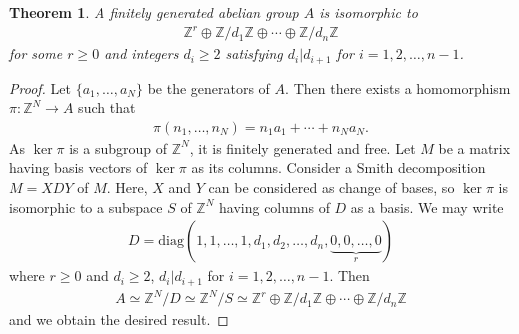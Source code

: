 \documentclass[12pt]{report}
\theoremstyle{plain}
\newtheorem{theorem}{Theorem}[section]
\theoremstyle{remark}
\theoremstyle{definition}
\newcommand{\Z}{\mathbb{Z}}
\begin{document}
\begin{theorem}\label{Theorem 1.18.8.}
    A finitely generated abelian group $A$ is isomorphic to
    \begin{align*}
        \Z^r \oplus \Z/d_1\Z \oplus \cdots\oplus \Z/d_n\Z
    \end{align*}
    for some $r\ge 0$ and integers $d_i\ge 2$ satisfying $d_i|d_{i+1}$ for $i=1,2,\dots,n-1$.
\end{theorem}
\begin{proof}
    Let $\{a_1,\dots,a_N\}$ be the generators of $A$. Then there exists a homomorphism
    $\pi:\Z^N\rightarrow A$ such that
    \begin{align*}
        \pi(n_1,\dots,n_N) = n_1a_1 + \cdots+n_Na_N.
    \end{align*}
    As $\ker \pi$ is a subgroup of $\Z^N$, it is finitely generated and free. Let $M$ be a matrix having basis vectors of $\ker\pi$ as its columns. Consider a Smith decomposition $M=XDY$ of $M$. Here, $X$ and $Y$ can be considered as change of bases, so $\ker\pi$ is isomorphic to a subspace $S$ of $\Z^N$ having columns of $D$ as a basis. We may write
    \begin{align*}
        D = \mathrm{diag}(1,1,\dots,1,d_1,d_2,\dots,d_n,\underbrace{0,0,\dots,0}_r)
    \end{align*}
    where $r\ge 0$ and $d_i\ge 2$, $d_i|d_{i+1}$ for $i=1,2,\dots,n-1$. Then
    \begin{align*}
        A\simeq \Z^N/D\simeq \Z^N/S \simeq \Z^r \oplus \Z/d_1\Z \oplus \cdots\oplus \Z/d_n\Z
    \end{align*}
    and we obtain the desired result.
\end{proof}
\end{document}
